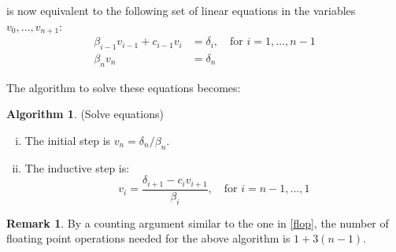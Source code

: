 \documentclass[a4paper,10pt]{scrartcl}\sloppy
\theoremstyle{definition}
\newtheorem{rem}[thm]{Remark}
\newtheorem{alg}[ALG]{Algorithm}
\begin{document}
 is now equivalent to the following set of linear equations in the variables $v_0,\ldots,v_{n+1}$:
\begin{align*}
\beta_{i-1}v_{i-1}+c_{i-1}v_i &= \delta_i,\quad \textrm{for }i=1,\ldots,n-1\\
\beta_n v_n &= \delta_n
\end{align*}


\noindent The algorithm to solve these equations becomes:

\begin{alg}\label{solveq}(Solve equations)
\begin{enumerate}[(i)]
\item The initial step is $v_n = \delta_n/\beta_n$.
\item The inductive step is: $$v_i= \frac{\delta_{i+1}-c_iv_{i+1}}{\beta_i}, \quad \textrm{for } i=n-1,...,1$$
\end{enumerate}
\end{alg}
\begin{rem} By a counting argument similar to the one in \cref{flop}, the number of floating point operations needed for the above algorithm is $1+3(n-1)$.
\end{rem}
\end{document}
